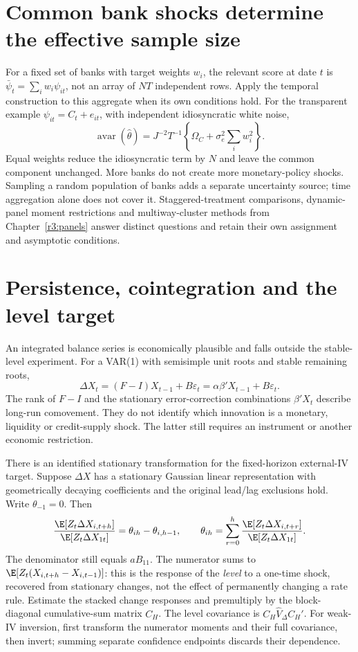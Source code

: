 \section{Common bank shocks determine the effective sample size}
\label{s4:date-panel}
For a fixed set of banks with target weights $w_i$, the relevant score at
date $t$ is $\bar\psi_t=\sum_iw_i\psi_{it}$, not an array of $NT$
independent rows. Apply the temporal construction to this aggregate when
its own conditions hold. For the transparent example
$\psi_{it}=C_t+e_{it}$, with independent idiosyncratic white noise,
\[
 \operatorname{avar}(\widehat\theta)
 =J^{-2}T^{-1}\left\{\Omega_C+\sigma_e^2\sum_iw_i^2\right\}.
\]
Equal weights reduce the idiosyncratic term by $N$ and leave the common
component unchanged. More banks do not create more monetary-policy shocks.
Sampling a random population of banks adds a separate uncertainty source;
time aggregation alone does not cover it. Staggered-treatment comparisons,
dynamic-panel moment restrictions and multiway-cluster methods from
Chapter~\ref{r3:panels} answer distinct questions and retain their own
assignment and asymptotic conditions.

\section{Persistence, cointegration and the level target}
\label{s4:integrated-responses}
An integrated balance series is economically plausible and falls outside
the stable-level experiment. For a VAR(1) with semisimple unit roots and
stable remaining roots,
\[
 \Delta X_t=(F-I)X_{t-1}+B\varepsilon_t
             =\alpha\beta'X_{t-1}+B\varepsilon_t.
\]
The rank of $F-I$ and the stationary error-correction combinations
$\beta'X_t$ describe long-run comovement. They do not identify which
innovation is a monetary, liquidity or credit-supply shock. The latter
still requires an instrument or another economic restriction.

There is an identified stationary transformation for the fixed-horizon
external-IV target. Suppose $\Delta X$ has a stationary Gaussian linear
representation with geometrically decaying coefficients and the original
lead/lag exclusions hold. Write $\theta_{-1}=0$. Then
\[
 \frac{\E[Z_t\Delta X_{i,t+h}]}{\E[Z_t\Delta X_{1t}]}
       =\theta_{ih}-\theta_{i,h-1},\qquad
 \theta_{ih}=\sum_{r=0}^h
       \frac{\E[Z_t\Delta X_{i,t+r}]}{\E[Z_t\Delta X_{1t}]}.
\]
The denominator still equals $aB_{11}$. The numerator sums to
$\E[Z_t(X_{i,t+h}-X_{i,t-1})]$: this is the response of the
\emph{level} to a one-time shock, recovered from stationary changes,
not the effect of permanently changing a rate rule. Estimate the stacked
change responses and premultiply by the block-diagonal cumulative-sum
matrix $C_H$. The level covariance is
$C_H\widehat V_\Delta C_H'$. For weak-IV inversion, first transform
the numerator moments and their full covariance, then invert; summing
separate confidence endpoints discards their dependence.

